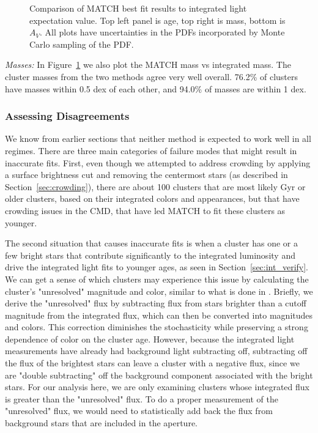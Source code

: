 \documentclass{emulateapj}
\begin{document}
\begin{figure}[!htbp]
\caption{Comparison of MATCH best fit results to integrated light expectation value.  Top left panel is age, top right is mass, bottom is $A_V$.  All plots have uncertainties in the PDFs incorporated by Monte Carlo sampling of the PDF.}
\label{fig:int_match_comp}
\end{figure}


{\emph {Masses:}}
In Figure~\ref{fig:int_match_comp} we also plot the MATCH mass vs integrated mass.  The cluster masses from the two methods agree very well overall.  76.2\% of clusters have masses within 0.5 dex of each other, and 94.0\% of masses are within 1 dex.  

\subsubsection{Assessing Disagreements}\label{sec:disagree}
We know from earlier sections that neither method is expected to work well in all regimes.  There are three main categories of failure modes that might result in inaccurate fits.  First, even though we attempted to address crowding by applying a surface brightness cut and removing the centermost stars (as described in Section~\ref{sec:crowding}), there are about 100 clusters that are most likely Gyr or older clusters, based on their integrated colors and appearances, but that have crowding issues in the CMD, that have led MATCH to fit these clusters as younger.

The second situation that causes inaccurate fits is when a cluster has one or a few bright stars that contribute significantly to the integrated luminosity and drive the integrated light fits to younger ages, as seen in Section~\ref{sec:int_verify}.  We can get a sense of which clusters may experience this issue by calculating the cluster's "unresolved" magnitude and color, similar to what is done in \cite{Beerman12}.  Briefly, we derive the "unresolved" flux by subtracting flux from stars brighter than a cutoff magnitude from the integrated flux, which can then be converted into magnitudes and colors.  This correction diminishes the stochasticity while preserving a strong dependence of color on the cluster age.  However, because the integrated light measurements have already had background light subtracting off, subtracting off the flux of the brightest stars can leave a cluster with a negative flux, since we are "double subtracting" off the background component associated with the bright stars.  For our analysis here, we are only examining clusters whose integrated flux is greater than the "unresolved" flux.  To do a proper measurement of the "unresolved" flux, we would need to statistically add back the flux from background stars that are included in the aperture.  
\end{document}

